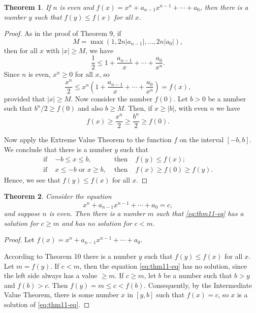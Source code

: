 \documentclass{article}
\numberwithin{corollary}{subsection}
\numberwithin{definition}{subsection}
\numberwithin{lemma}{subsection}
\newtheorem{theorem}{Theorem}
\numberwithin{theorem}{subsection}
\begin{document}
\begin{theorem}
  If $n$ is even and $f(x) = x^n + a_{n-1}x^{n-1} + \cdots + a_0$, then there
  is a number $y$ such that $f(y) \leq f(x)$ for all $x$.
\end{theorem}
\begin{proof}
  As in the proof of Theorem 9, if \[
    M = \max(1, 2n|a_{n-1}|, \ldots, 2n|a_0|),
  \] then for all $x$ with $|x| \geq M$, we have \[
    \frac{1}{2} \leq 1 + \frac{a_{n-1}}{x} + \cdots + \frac{a_0}{x^n}.
  \] Since $n$ is even, $x^n \geq 0$ for all $x$, so \[
    \frac{x^n}{2}
    \leq x^n \left(1 + \frac{a_{n-1}}{x} + \cdots + \frac{a_0}{x^n}\right)
    = f(x),
  \] provided that $|x| \geq M$. Now consider the number $f(0)$. Let $b > 0$ be
  a number such that $b^n/2 \geq f(0)$ and also $b \geq M$. Then, if $x \geq
  |b|$, with even $n$ we have \[
    f(x) \geq \frac{x^n}{2} \geq \frac{b^n}{2} \geq f(0).
  \]

  Now apply the Extreme Value Theorem to the function $f$ on the interval $[-b,
  b]$. We conclude that there is a number $y$ such that
  \begin{align*}
    \text{if } &-b \leq x \leq b, &\text{ then } &f(y) \leq f(x); \\
    \text{if } &x \leq -b \text{ or } x \geq b, &\text{ then } &f(x) \geq f(0)
      \geq f(y).
  \end{align*}
  Hence, we see that $f(y) \leq f(x)$ for all $x$.
\end{proof}

\begin{theorem}
  Consider the equation
  \begin{equation} \label{eq:thm11-eq} \tag{*}
    x^n + a_{n-1}x^{n-1} + \cdots + a_0 = c, 
  \end{equation}
  and suppose $n$ is even. Then there is a number $m$ such that
  \eqref{eq:thm11-eq} has a solution for $c \geq m$ and has no solution for $c
  < m$.
\end{theorem}
\begin{proof}
  Let $f(x) = x^n + a_{n-1}x^{n-1} + \cdots + a_0$.

  According to Theorem 10 there is a number $y$ such that $f(y) \leq f(x)$ for
  all $x$. Let $m = f(y)$. If $c < m$, then the equation \eqref{eq:thm11-eq}
  has no solution, since the left side always has a value $\geq m$. If $c \geq
  m$, let $b$ be a number such that $b > y$ and $f(b) > c$. Then $f(y) = m \leq
  c < f(b)$. Consequently, by the Intermediate Value Theorem, there is some
  number $x$ in $[y, b]$ such that $f(x) = c$, so $x$ is a solution of
  \eqref{eq:thm11-eq}.
\end{proof}
\end{document}
